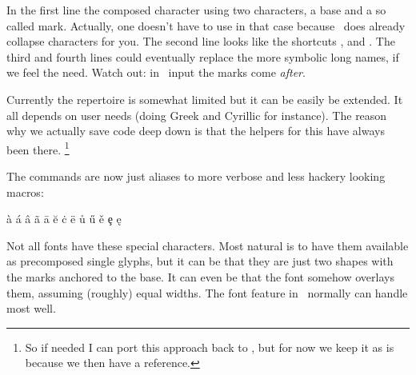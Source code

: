 \typebuffer[option=TEX]

In the first line the composed character using two characters, a base and a so
called mark. Actually, one doesn't have to use \type {\chr} in that case because
\CONTEXT\ does already collapse characters for you. The second line looks like
the shortcuts \type {\`}, \type {\'} and \type {\"}. The third and fourth lines
could eventually replace the more symbolic long names, if we feel the need. Watch
out: in \UNICODE\ input the marks come {\em after}.

\startlines \getbuffer \stoplines

Currently the repertoire is somewhat limited but it can be easily be extended. It
all depends on user needs (doing Greek and Cyrillic for instance). The reason why
we actually save code deep down is that the helpers for this have always been
there. \footnote {So if needed I can port this approach back to \MKIV, but for
now we keep it as is because we then have a reference.}

The \type {\"} commands are now just aliases to more verbose and less hackery
looking macros:

\starttabulate[|||||]
    \NC \type {\withgrave}        \NC {} \NC \type {\`} \NC \`{a} \NC \NR
    \NC \type {\withacute}        \NC {} \NC \type {\'} \NC \'{a} \NC \NR
    \NC \type {\withcircumflex}   \NC {} \NC \type {\^} \NC \^{a} \NC \NR
    \NC \type {\withtilde}        \NC {} \NC \type {\~} \NC \~{a} \NC \NR
    \NC \type {\withmacron}       \NC {} \NC \type {\=} \NC \={a} \NC \NR
    \NC \type {\withbreve}        \NC {} \NC \type {\u} \NC \u{e} \NC \NR
    \NC \type {\withdotaccent}    \NC {} \NC \type {\.} \NC \.{c} \NC \NR
    \NC \type {\withdiaeresis}    \NC {} \NC \type {\"} \NC \"{e} \NC \NR
    \NC \type {\withring}         \NC {} \NC \type {\r} \NC \r{u} \NC \NR
    \NC \type {\withhungarumlaut} \NC {} \NC \type {\H} \NC \H{u} \NC \NR
    \NC \type {\withcaron}        \NC {} \NC \type {\v} \NC \v{e} \NC \NR
    \NC \type {\withcedilla}      \NC {} \NC \type {\c} \NC \c{e} \NC \NR
    \NC \type {\withogonek}       \NC {} \NC \type {\k} \NC \k{e} \NC \NR
\stoptabulate

Not all fonts have these special characters. Most natural is to have them
available as precomposed single glyphs, but it can be that they are just two
shapes with the marks anchored to the base. It can even be that the font somehow
overlays them, assuming (roughly) equal widths. The  font feature
in \CONTEXT\ normally can handle most well.

